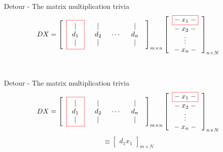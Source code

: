 \documentclass{beamer}
\begin{document}
\begin{frame}{Detour - The matrix multiplication trivia}
    \[
    DX=
    \left[
    \begin{array}{cccc}
    \fcolorbox{red}{white}{$\begin{array}{c}|\\ d_1\\ |\end{array}$} &
    \begin{array}{c}|\\ d_2\\ |\end{array} &
    \cdots &
    \begin{array}{c}|\\ d_n\\ |\end{array}
    \end{array}
    \right]_{m\times n}
    \left[
    \begin{array}{c}
    \fcolorbox{red}{white}{${-}\;x_1\;{-}$} \\
    {-}\;x_2\;{-} \\
    \vdots \\
    {-}\;x_n\;{-}
    \end{array}
    \right]_{n\times N}
    \]
    \[
    \phantom{\equiv \left[\begin{array}{c}d_1x_1\end{array}\right]_{m\times N}}
    \]
\end{frame}

\begin{frame}{Detour - The matrix multiplication trivia}
    \[
    DX=
    \left[
    \begin{array}{cccc}
    \fcolorbox{red}{white}{$\begin{array}{c}|\\ d_1\\ |\end{array}$} &
    \begin{array}{c}|\\ d_2\\ |\end{array} &
    \cdots &
    \begin{array}{c}|\\ d_n\\ |\end{array}
    \end{array}
    \right]_{m\times n}
    \left[
    \begin{array}{c}
    \fcolorbox{red}{white}{${-}\;x_1\;{-}$} \\
    {-}\;x_2\;{-} \\
    \vdots \\
    {-}\;x_n\;{-}
    \end{array}
    \right]_{n\times N}
    \]
    \[
    \equiv
    \left[
    \begin{array}{c}
    d_1x_1
    \end{array}
    \right]_{m\times N}
    \]
\end{frame}
\end{document}
